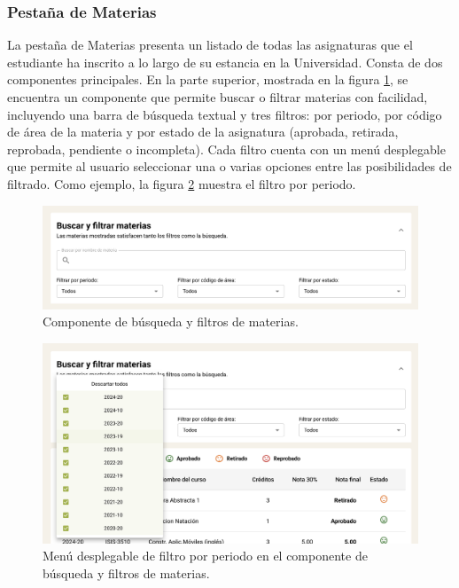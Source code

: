 \subsubsection{Pestaña de Materias}

La pestaña de Materias presenta un listado de todas las asignaturas que el estudiante ha inscrito a lo largo de su estancia en la Universidad. Consta de dos componentes principales. En la parte superior, mostrada en la figura \ref{fig:filtros_materias}, se encuentra un componente que permite buscar o filtrar materias con facilidad, incluyendo una barra de búsqueda textual y tres filtros: por periodo, por código de área de la materia y por estado de la asignatura (aprobada, retirada, reprobada, pendiente o incompleta). Cada filtro cuenta con un menú desplegable que permite al usuario seleccionar una o varias opciones entre las posibilidades de filtrado. Como ejemplo, la figura \ref{fig:filtro_periodo_materias} muestra el filtro por periodo.

\begin{figure}[H]
	\includegraphics[width=\textwidth]{assets/nes/filtros_materias.png}
	\caption{Componente de búsqueda y filtros de materias.}
	\label{fig:filtros_materias}
\end{figure}

\begin{figure}[H]
	\includegraphics[width=\textwidth]{assets/nes/filtro_periodo_materias.png}
	\caption{Menú desplegable de filtro por periodo en el componente de búsqueda y filtros de materias.}
	\label{fig:filtro_periodo_materias}
\end{figure}

